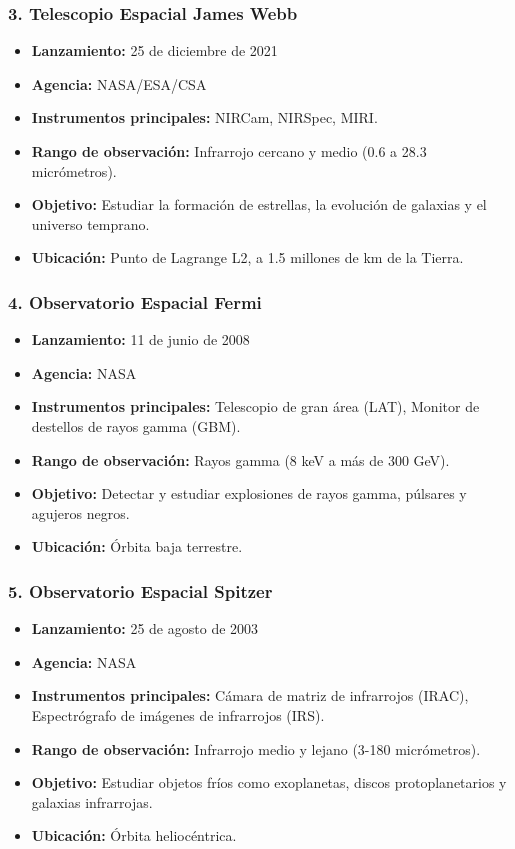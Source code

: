 \documentclass{article}
\begin{document}
\subsubsection*{3. Telescopio Espacial James Webb}
\begin{itemize}
    \item \textbf{Lanzamiento:} 25 de diciembre de 2021
    \item \textbf{Agencia:} NASA/ESA/CSA
    \item \textbf{Instrumentos principales:} NIRCam, NIRSpec, MIRI.
    \item \textbf{Rango de observación:} Infrarrojo cercano y medio (0.6 a 28.3 micrómetros).
    \item \textbf{Objetivo:} Estudiar la formación de estrellas, la evolución de galaxias y el universo temprano.
    \item \textbf{Ubicación:} Punto de Lagrange L2, a 1.5 millones de km de la Tierra.
\end{itemize}

\subsubsection*{4. Observatorio Espacial Fermi}
\begin{itemize}
    \item \textbf{Lanzamiento:} 11 de junio de 2008
    \item \textbf{Agencia:} NASA
    \item \textbf{Instrumentos principales:} Telescopio de gran área (LAT), Monitor de destellos de rayos gamma (GBM).
    \item \textbf{Rango de observación:} Rayos gamma (8 keV a más de 300 GeV).
    \item \textbf{Objetivo:} Detectar y estudiar explosiones de rayos gamma, púlsares y agujeros negros.
    \item \textbf{Ubicación:} Órbita baja terrestre.
\end{itemize}

\subsubsection*{5. Observatorio Espacial Spitzer}
\begin{itemize}
    \item \textbf{Lanzamiento:} 25 de agosto de 2003
    \item \textbf{Agencia:} NASA
    \item \textbf{Instrumentos principales:} Cámara de matriz de infrarrojos (IRAC), Espectrógrafo de imágenes de infrarrojos (IRS).
    \item \textbf{Rango de observación:} Infrarrojo medio y lejano (3-180 micrómetros).
    \item \textbf{Objetivo:} Estudiar objetos fríos como exoplanetas, discos protoplanetarios y galaxias infrarrojas.
    \item \textbf{Ubicación:} Órbita heliocéntrica.
\end{itemize}
\end{document}
